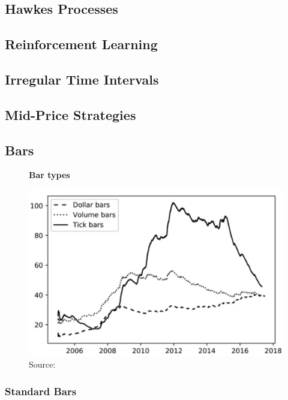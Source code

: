\documentclass{article}
\begin{document}
\subsection{Hawkes Processes \cite{hawkes}}

\subsection{Reinforcement Learning \cite{reinforcement}}

\subsection{Irregular Time Intervals \cite{garch}}

\subsection{Mid-Price Strategies \cite{midprice}}

\subsection{Bars \cite{advances_in_ml}}

\begin{figure}[!htbp]
     \centering
     \textbf{Bar types}\par\medskip
     \includegraphics[scale=0.28]{bars.png}
     \caption{Source: \cite{advances_in_ml}}
\end{figure}

\subsubsection{Standard Bars}
\end{document}

